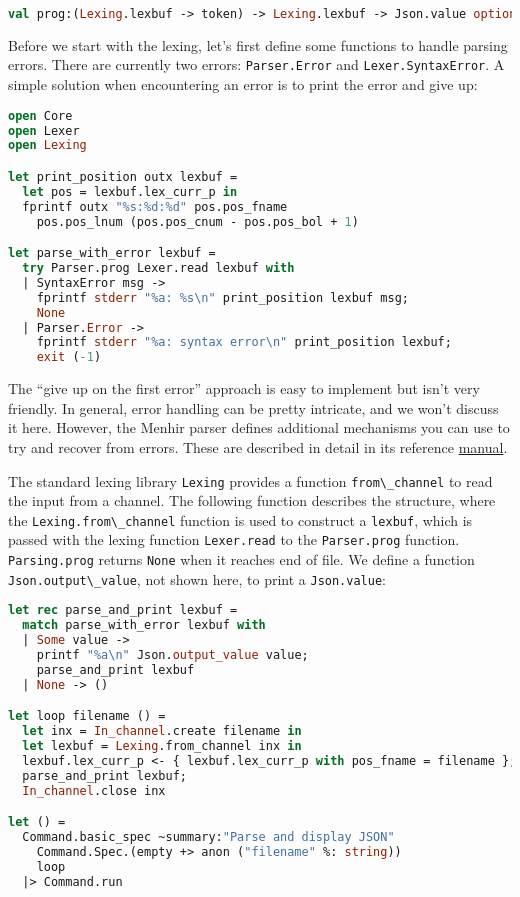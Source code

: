\begin{lstlisting}[language=Caml]
val prog:(Lexing.lexbuf -> token) -> Lexing.lexbuf -> Json.value option
\end{lstlisting}

Before we start with the lexing, let's first define some functions to
handle parsing errors. There are currently two errors:
\passthrough{\lstinline!Parser.Error!} and
\passthrough{\lstinline!Lexer.SyntaxError!}. A simple solution when
encountering an error is to print the error and give up:

\begin{lstlisting}[language=Caml]
open Core
open Lexer
open Lexing

let print_position outx lexbuf =
  let pos = lexbuf.lex_curr_p in
  fprintf outx "%s:%d:%d" pos.pos_fname
    pos.pos_lnum (pos.pos_cnum - pos.pos_bol + 1)

let parse_with_error lexbuf =
  try Parser.prog Lexer.read lexbuf with
  | SyntaxError msg ->
    fprintf stderr "%a: %s\n" print_position lexbuf msg;
    None
  | Parser.Error ->
    fprintf stderr "%a: syntax error\n" print_position lexbuf;
    exit (-1)
\end{lstlisting}

The ``give up on the first error'' approach is easy to implement but
isn't very friendly. In general, error handling can be pretty intricate,
and we won't discuss it here. However, the Menhir parser defines
additional mechanisms you can use to try and recover from errors. These
are described in detail in its reference
\href{http://gallium.inria.fr/~fpottier/menhir/}{manual}.

The standard lexing library \passthrough{\lstinline!Lexing!} provides a
function \passthrough{\lstinline!from\_channel!} to read the input from
a channel. The following function describes the structure, where the
\passthrough{\lstinline!Lexing.from\_channel!} function is used to
construct a \passthrough{\lstinline!lexbuf!}, which is passed with the
lexing function \passthrough{\lstinline!Lexer.read!} to the
\passthrough{\lstinline!Parser.prog!} function.
\passthrough{\lstinline!Parsing.prog!} returns
\passthrough{\lstinline!None!} when it reaches end of file. We define a
function \passthrough{\lstinline!Json.output\_value!}, not shown here,
to print a \passthrough{\lstinline!Json.value!}:

\begin{lstlisting}[language=Caml]
let rec parse_and_print lexbuf =
  match parse_with_error lexbuf with
  | Some value ->
    printf "%a\n" Json.output_value value;
    parse_and_print lexbuf
  | None -> ()

let loop filename () =
  let inx = In_channel.create filename in
  let lexbuf = Lexing.from_channel inx in
  lexbuf.lex_curr_p <- { lexbuf.lex_curr_p with pos_fname = filename };
  parse_and_print lexbuf;
  In_channel.close inx

let () =
  Command.basic_spec ~summary:"Parse and display JSON"
    Command.Spec.(empty +> anon ("filename" %: string))
    loop
  |> Command.run
\end{lstlisting}

